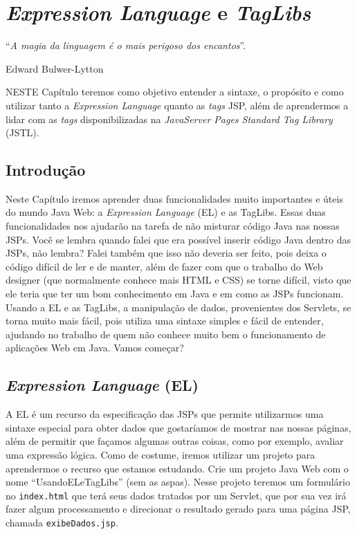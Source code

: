 \chapter{\textit{Expression Language} e \textit{TagLibs}}\label{cap:elTagLibs}
\epigraph{``\textit{A magia da linguagem é o mais perigoso dos encantos}''.}{Edward Bulwer-Lytton}

\lettrine[lines=4, lhang=0.1, lraise=0, loversize=0.2, findent=0.1em]{\textcolor{corTema}{N}}{ESTE} Capítulo teremos como objetivo entender a sintaxe, o propósito e como utilizar tanto a \textit{Expression Language} quanto as \textit{tags} JSP, além de aprendermos a lidar com as \textit{tags} disponibilizadas na \textit{JavaServer Pages Standard Tag Library} (JSTL).


\section{Introdução}

Neste Capítulo iremos aprender duas funcionalidades muito importantes e úteis do mundo Java Web: a \textit{Expression Language} (EL) e as TagLibs. Essas duas funcionalidades nos ajudarão na tarefa de não misturar código Java nas nossas JSPs. Você se lembra quando falei que era possível inserir código Java dentro das JSPs, não lembra? Falei também que isso não deveria ser feito, pois deixa o código difícil de ler e de manter, além de fazer com que o trabalho do Web designer (que normalmente conhece mais HTML e CSS) se torne difícil, visto que ele teria que ter um bom conhecimento em Java e em como as JSPs funcionam. Usando a EL e as TagLibs, a manipulação de dados, provenientes dos Servlets, se torna muito mais fácil, pois utiliza uma sintaxe simples e fácil de entender, ajudando no trabalho de quem não conhece muito bem o funcionamento de aplicações Web em Java. Vamos começar?


\section{\textit{Expression Language} (EL)}

A EL é um recurso da especificação das JSPs que permite utilizarmos uma sintaxe especial para obter dados que gostaríamos de mostrar nas nossas páginas, além de permitir que façamos algumas outras coisas, como por exemplo, avaliar uma expressão lógica. Como de costume, iremos utilizar um projeto para aprendermos o recurso que estamos estudando. Crie um projeto Java Web com o nome ``UsandoELeTagLibs'' (sem as aspas). Nesse projeto teremos um formulário no \texttt{index.html} que terá seus dados tratados por um Servlet, que por sua vez irá fazer algum processamento e direcionar o resultado gerado para uma página JSP, chamada \texttt{exibeDados.jsp}.

